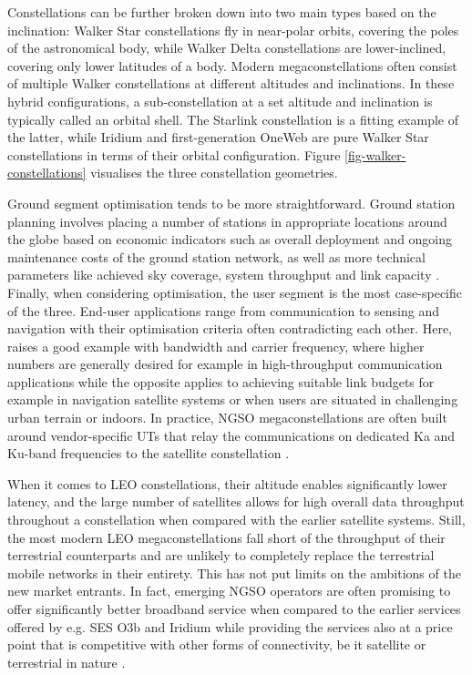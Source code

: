 \documentclass[english, 12pt, a4paper, elec, utf8, a-1b, online]{aaltothesis}
\begin{document}
Constellations can be further broken down into two main types based on the inclination: Walker Star constellations fly in near-polar orbits, covering the poles of the astronomical body, while Walker Delta constellations are lower-inclined, covering only lower latitudes of a body.
Modern megaconstellations often consist of multiple Walker constellations at different altitudes and inclinations. In these hybrid configurations, a sub-constellation at a set altitude and inclination is typically called an orbital shell.
The Starlink constellation is a fitting example of the latter, while Iridium and first-generation OneWeb are pure Walker Star constellations in terms of their orbital configuration.
Figure \ref{fig-walker-constellations} visualises the three constellation geometries.

Ground segment optimisation tends to be more straightforward.
Ground station planning involves placing a number of stations in appropriate locations around the globe based on economic indicators such as overall deployment and ongoing maintenance costs of the ground station network, as well as more technical parameters like achieved sky coverage, system throughput and link capacity \cite{celikbilek2022survey}.
Finally, when considering optimisation, the user segment is the most case-specific of the three.
End-user applications range from communication to sensing and navigation with their optimisation criteria often contradicting each other.
Here, \cite{celikbilek2022survey} raises a good example with bandwidth and carrier frequency, where higher numbers are generally desired for example in high-throughput communication applications while the opposite applies to achieving suitable link budgets for example in navigation satellite systems or when users are situated in challenging urban terrain or indoors.
In practice, NGSO megaconstellations are often built around vendor-specific UTs that relay the communications on dedicated Ka and Ku-band frequencies to the satellite constellation \cite{euspa-secure-satcom-2023}.

When it comes to LEO constellations, their altitude enables significantly lower latency, and the large number of satellites allows for high overall data throughput throughout a constellation when compared with the earlier satellite systems.
Still, the most modern LEO megaconstellations fall short of the throughput of their terrestrial counterparts and are unlikely to completely replace the terrestrial mobile networks in their entirety.
This has not put limits on the ambitions of the new market entrants. In fact, emerging NGSO operators are often promising to offer significantly better broadband service when compared to the earlier services offered by e.g. SES O3b and Iridium while providing the services also at a price point that is competitive with other forms of connectivity, be it satellite or terrestrial in nature \cite{euspa-secure-satcom-2023}.
\end{document}
